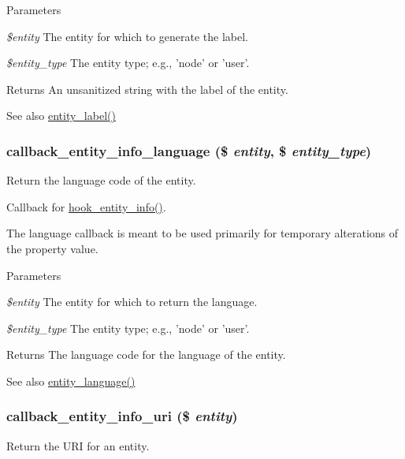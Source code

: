 \begin{DoxyParams}{Parameters}
\item[{\em \$entity}]The entity for which to generate the label. \item[{\em \$entity\_\-type}]The entity type; e.g., 'node' or 'user'.\end{DoxyParams}
\begin{DoxyReturn}{Returns}
An unsanitized string with the label of the entity.
\end{DoxyReturn}
\begin{DoxySeeAlso}{See also}
\hyperlink{common_8inc_aa9868513964b440f8206571573b833b3}{entity\_\-label()} 
\end{DoxySeeAlso}
\hypertarget{group__callbacks_ga6e4c07daa3660701139f60cd79bb3665}{
\subsubsection[{callback\_\-entity\_\-info\_\-language}]{\setlength{\rightskip}{0pt plus 5cm}callback\_\-entity\_\-info\_\-language (\$ {\em entity}, \/  \$ {\em entity\_\-type})}}
\label{group__callbacks_ga6e4c07daa3660701139f60cd79bb3665}
Return the language code of the entity.

Callback for \hyperlink{group__hooks_gaf02318e9d0e8cdbf6d187b271b9969a8}{hook\_\-entity\_\-info()}.

The language callback is meant to be used primarily for temporary alterations of the property value.


\begin{DoxyParams}{Parameters}
\item[{\em \$entity}]The entity for which to return the language. \item[{\em \$entity\_\-type}]The entity type; e.g., 'node' or 'user'.\end{DoxyParams}
\begin{DoxyReturn}{Returns}
The language code for the language of the entity.
\end{DoxyReturn}
\begin{DoxySeeAlso}{See also}
\hyperlink{common_8inc_abd1bd4466071377d474040174c49f06b}{entity\_\-language()} 
\end{DoxySeeAlso}
\hypertarget{group__callbacks_ga42bf4e69ee32b2bc99d0d774d4917254}{
\subsubsection[{callback\_\-entity\_\-info\_\-uri}]{\setlength{\rightskip}{0pt plus 5cm}callback\_\-entity\_\-info\_\-uri (\$ {\em entity})}}
\label{group__callbacks_ga42bf4e69ee32b2bc99d0d774d4917254}
Return the URI for an entity.

